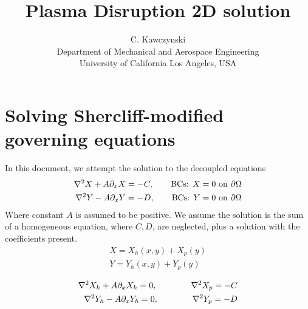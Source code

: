 \documentclass[11pt]{article}
\begin{document}
\doublespacing
\title{Plasma Disruption 2D solution}
\author{C. Kawczynski \\
Department of Mechanical and Aerospace Engineering \\
University of California Los Angeles, USA\\
}
\maketitle

\section{Solving Shercliff-modified governing equations}
In this document, we attempt the solution to the decoupled equations
\begin{equation}\begin{aligned}
\nabla^2 X + A \partial_x X = - C, \qquad \text{BCs: $X = 0 $ on $\partial \Omega$} \\
\nabla^2 Y - A \partial_x Y = - D, \qquad \text{BCs: $Y = 0 $ on $\partial \Omega$} \\
\end{aligned} \end{equation}
Where constant $A$ is assumed to be positive. We assume the solution is the sum of a homogeneous equation, where $C,D$, are neglected, plus a solution with the coefficients present.
\begin{equation}\begin{aligned}
X = X_h(x,y) + X_p(y) \\
Y = Y_h(x,y) + Y_p(y) \\
\end{aligned} \end{equation}
\begin{equation}\begin{aligned}
\nabla^2 X_h + A \partial_x X_h = 0, \qquad\qquad \nabla^2 X_p = -C \\
\nabla^2 Y_h - A \partial_x Y_h = 0, \qquad\qquad \nabla^2 Y_p = -D \\
\end{aligned} \end{equation}
\end{document}
